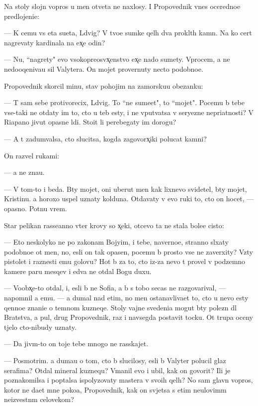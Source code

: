 \documentclass[10pt]{book}
\begin{document}
Na stoly slojn{\yi}{\y} vopros u men{\ia} otveta ne naxlosy. I Propovednik vnes oceredno{\y}e predlojeni{\y}e:

— K cemu vs{\ia} eta su{\y}eta, L{\iu}dvig? V tvo{\y}e{\y} sumke qel{\yi}h dva prokl{\ia}t{\yi}h kamn{\ia}. Na ko{\y} cert nagrevaty kardinala na {\y}ex̨e odin?

— Nu, ``nagrety" {\y}evo v{\yi}sokopreosv{\ia}x̨enstvo {\y}ex̨e nado sumety. Vprocem, {\y}a ne nedooqeniva{\y}u sil{\yi} Valytera. On mojet provernuty necto podobno{\y}e.

Propovednik skorcil minu, stav pohojim na zamorsku{\y}u obez{\y}anku:

— T{\yi} sam sebe protivorecix, L{\iu}dvig. To ``ne sume{\y}et", to ``mojet". Pocemu b{\yi} tebe vse-taki ne otdaty im to, cto u teb{\ia} {\y}esty, i ne vput{\yi}vatsa v seryezn{\yi}{\y}e nepri{\y}atnosti? V Riapano jivut opasn{\yi}{\y}e l{\iu}di. Sto{\y}it li perebegaty im dorogu?

— A t{\yi} zadum{\yi}valsa, cto slucitsa, kogda zagovorx̨iki polucat kamni?

On razvel rukami:

— {\Y}a ne zna{\y}u.

— V tom-to i beda. B{\yi}ty mojet, oni uberut men{\ia} kak lixnevo svidetel{\ia}, b{\yi}ty mojet, Kristinu. {\Y}a horoxo uspel uznaty kolduna. Otdavaty v {\y}evo ruki to, cto on hocet, — opasno. Pot{\ia}nu vrem{\ia}.

Star{\yi}{\y} pelikan rasse{\y}anno v{\yi}ter krovy so x̨eki, otcevo ta ne stala bole{\y}e cisto{\y}:

— Eto neskolyko ne po zakonam Bojyim, i tebe, naverno{\y}e, stranno sl{\yi}xaty podobno{\y}e ot men{\ia}, no, {\y}esli on tak opasen, pocemu b{\yi} prosto vse ne zaverxity? Vz{\ia}ty pistolet i raznesti {\y}emu golovu? Hot{\ia} b{\yi} za to, cto iz-za nevo t{\yi} provel v podzemno{\y} kamere paru mes{\ia}qev i {\y}edva ne otdal Bogu duxu.

— Voobx̨e-to otdal, i, {\y}esli b{\yi} ne Sofi{\y}a, {\y}a b{\yi} s tobo{\y} se{\y}cas ne razgovarival, — napomnil {\y}a {\y}emu. — {\Y}a dumal nad etim, no men{\ia} ostanavliva{\y}et to, cto u nevo {\y}esty qenno{\y}e znani{\y}e o temnom kuzneqe. Stoly vajn{\yi}{\y}e svedeni{\y}a mogut b{\yi}ty polezn{\yi} dl{\ia} Bratstva, a pul{\ia}, drug Propovednik, raz i navsegda postavit tocku. Ot trupa oceny t{\ia}jelo cto-nibudy uznaty.

— Da jiv{\yi}m-to on toje tebe mnogo ne rasskajet.

— Posmotrim. {\Y}a duma{\y}u o tom, cto b{\yi} slucilosy, {\y}esli b{\yi} Valyter polucil glaz serafima? Otdal mineral kuznequ? V{\yi}manil {\y}evo i ubil, kak on govorit? Ili je poznakomilsa i pop{\yi}talsa ispolyzovaty mastera v svo{\y}ih qel{\ia}h? No sam{\yi}{\y} glavn{\yi}{\y} vopros, kotor{\yi}{\y} ne da{\y}et mne poko{\y}a, Propovednik, kak on sv{\ia}jetsa s etim neulovim{\yi}m ne{\y}izvestn{\yi}m celovekom?
\end{document}
